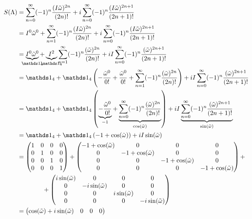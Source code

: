 \begin{align}
  \label{eq:43}
  S(\Lambda) &= \sum_{n=0}^{\infty}(-1)^n\frac{(I\tilde\omega)^{2n}}{(2n)!} + i\sum_{n=0}^{\infty}(-1)^n\frac{(I\tilde\omega)^{2n+1}}{(2n+1)!} \notag \\
&= I^0\tilde\omega^0 +  \sum_{n=1}^{\infty}(-1)^n\frac{(I\tilde\omega)^{2n}}{(2n)!} + i\sum_{n=0}^{\infty}(-1)^n\frac{(I\tilde\omega)^{2n+1}}{(2n+1)!} \notag \\
&= \underbr{ I^0\tilde\omega^0}_{\mathds 1_4} +  \underbr{I^2}_{\mathds 1_4}\sum_{n=1}^{\infty}(-1)^n\frac{(\tilde\omega)^{2n}}{(2n)!} + iI\sum_{n=0}^{\infty}(-1)^n\frac{(\tilde\omega)^{2n+1}}{(2n+1)!} \notag \\
&= \mathds 1_4 +  \mathds 1_4 \left(-\frac{\tilde\omega^0}{0!} + \frac{\tilde\omega^0}{0!} + \sum_{n=1}^{\infty}(-1)^n\frac{(\tilde\omega)^{2n}}{(2n)!} \right) + iI\sum_{n=0}^{\infty}(-1)^n\frac{(\tilde\omega)^{2n+1}}{(2n+1)!} \notag \\
&=\mathds 1_4  +  \mathds 1_4 \left(\underbr{-\frac{\tilde\omega^0}{0!}}_{-1} + \underbr{\sum_{n=0}^{\infty}(-1)^n\frac{(\tilde\omega)^{2n}}{(2n)!}}_{\cos(\tilde\omega)} \right) + iI \underbr{ \sum_{n=0}^{\infty}(-1)^n\frac{(\tilde\omega)^{2n+1}}{(2n+1)!}}_{\sin(\tilde\omega)} \notag \\
&= \mathds 1_4 +  \mathds 1_4 \left(-1 + \cos(\tilde\omega) \right) + iI \sin(\tilde\omega) \notag \\
&= \begin{pmatrix}1&0&0&0\\0&1&0&0\\ 0&0&1&0\\0&0&0&1 \end{pmatrix} + 
\begin{pmatrix}-1+\cos(\tilde\omega)&0&0&0\\0&-1+\cos(\tilde\omega)&0&0\\ 0&0&-1+\cos(\tilde\omega)&0\\0&0&0&-1+\cos(\tilde\omega) \end{pmatrix} +\notag \\
&\qquad\qquad + \begin{pmatrix}i\sin(\tilde\omega) &0&0&0\\0&-i\sin(\tilde\omega)&0&0\\ 0&0&i\sin(\tilde\omega)&0\\0&0&0&-i\sin(\tilde\omega) \end{pmatrix}\notag \\
 &= \begin{pmatrix}\cos(\tilde\omega)+i\sin(\tilde\omega) &0&0&0\\

\end{pmatrix}
\end{align}
